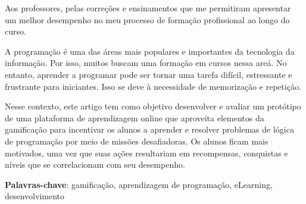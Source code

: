 \documentclass[
	12pt,				%
	oneside,			%
	a4paper,			%
	english,			%
	french,				%
	spanish,			%
	brazil				%
	]{abntex2}
\begin{document}

\frenchspacing


\imprimircapa



\imprimirfolhaderosto





\begin{agradecimentos}

Aos professores, pelas correções e ensinamentos que me permitiram
apresentar um melhor desempenho no meu processo de formação profissional
ao longo do curso.

\end{agradecimentos}



\setlength{\absparsep}{18pt} %
\begin{resumo}

  A programação é uma das áreas mais populares e importantes da tecnologia
  da informação. Por isso, muitos buscam uma formação em cursos nessa
  areá. No entanto, aprender a programar pode ser tornar uma tarefa
  difícil, estressante e frustrante para iniciantes. Isso se deve à
  necessidade de memorização e repetição.
  
  Nesse contexto, este artigo tem como objetivo desenvolver e avaliar um
  protótipo de uma plataforma de aprendizagem online que aproveita
  elementos da gamificação para incentivar os alunos a aprender e resolver
  problemas de lógica de programação por meio de missões desafiadoras. Os
  alunos ficam mais motivados, uma vez que suas ações resultariam em
  recompensas, conquistas e níveis que se correlacionam com seu
  desempenho.

 \textbf{Palavras-chave}: gamificação, aprendizagem de programação, eLearning, desenvolvimento
\end{resumo}
\end{document}

